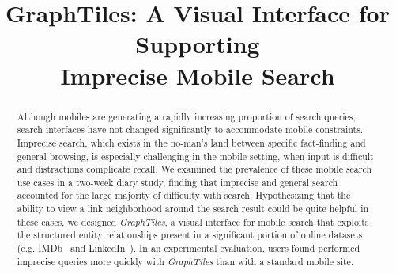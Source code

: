 \documentclass{sigchi}
\begin{document}
\title{GraphTiles: A Visual Interface for Supporting \\Imprecise Mobile Search}
%


\maketitle

\toappear

\begin{abstract}
Although mobiles are generating a rapidly increasing proportion of search queries, search interfaces have not changed significantly to accommodate mobile constraints. Imprecise search, which exists in the no-man's land between specific fact-finding and general browsing, is especially challenging in the mobile setting, when input is difficult and distractions complicate recall. We examined the prevalence of these mobile search use cases in a two-week diary study, finding that imprecise and general search accounted for the large majority of difficulty with search. Hypothesizing that the ability to view a link neighborhood around the search result could be quite helpful in these cases, we designed \textit{GraphTiles}, a visual interface for mobile search that exploits the structured entity relationships present in a significant portion of online datasets (e.g. IMDb~\cite{imdb} and LinkedIn~\cite{linkedin}). In an experimental evaluation, users found performed imprecise queries more quickly with \textit{GraphTiles} than with a standard mobile site. 
\end{abstract}
\end{document}
